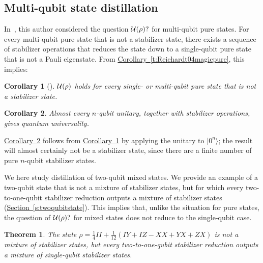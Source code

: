 \documentclass[11pt]{article}
\def\ket #1{\vert #1\rangle}
\newtheorem{theorem}{Theorem}  %
\newtheorem{corollary}{Corollary}
\theoremstyle{note}
\newcommand{\corref}[1]{\hyperref[#1]{{Corollary~\ref*{#1}}}}
\newcommand{\secref}[1]{\hyperref[#1]{{Section~\ref*{#1}}}}
\begin{document}
\subsection{Multi-qubit state distillation}

In~\cite{Reichardt04magic}, this author considered the question $\mathcal{U}(\rho)?$ for multi-qubit pure states.  For every multi-qubit pure state that is not a stabilizer state, there exists a sequence of stabilizer operations that reduces the state down to a single-qubit pure state that is not a Pauli eigenstate.  From \corref{t:Reichardt04magicpure}, this implies: 

\begin{corollary}[{\cite{Reichardt04magic}}] \label{t:Reichardt04magicpuremulti}
$\mathcal{U}(\rho)$ holds for every single- or multi-qubit pure state that is not a stabilizer state.
\end{corollary}

\begin{corollary} \label{t:Reichardt04magicunitarymulti}
Almost every $n$-qubit unitary, together with stabilizer operations, gives quantum universality.  
\end{corollary}

\noindent \corref{t:Reichardt04magicunitarymulti} follows from \corref{t:Reichardt04magicpuremulti} by applying the unitary to $\ket{0^n}$; the result will almost certainly not be a stabilizer state, since there are a finite number of pure $n$-qubit stabilizer states.  

We here study distillation of two-qubit mixed states.  We provide an example of a two-qubit state that is not a mixture of stabilizer states, but for which every two-to-one-qubit stabilizer reduction outputs a mixture of stabilizer states (\secref{s:twoqubitstate}).  This implies that, unlike the situation for pure states, the question of $\mathcal{U}(\rho)?$ for mixed states does not reduce to the single-qubit case.  

\begin{theorem} \label{t:twoqubitcounterexample}
The state $\rho = \tfrac{1}{4}II + \tfrac{1}{12}(IY + IZ - XX + YX + ZX)$ is not a mixture of stabilizer states, but every two-to-one-qubit stabilizer reduction outputs a mixture of single-qubit stabilizer states.
\end{theorem}
\end{document}
